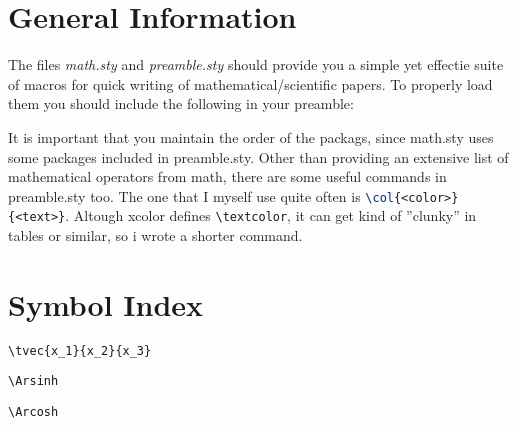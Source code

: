 \documentclass{report}
\begin{document}
  \section{General Information}
    The files \textit{math.sty} and \textit{preamble.sty} should provide you a simple yet effectie suite of
    macros for quick writing of mathematical/scientific papers. To properly load them you should include the
    following in your preamble:
    \begin{center}
        
    \end{center}

    It is important that you maintain the order of the packags, since math.sty uses some packages included in
    preamble.sty. Other than providing an extensive list of mathematical operators from math, there 
    are some useful commands in preamble.sty too.  The one that I myself use quite often is
    \lstinline[language=latex]|\col{<color>}{<text>}|. Altough xcolor defines \lstinline|\textcolor|,
    it can get kind of ''clunky'' in tables or similar, so i wrote a shorter command.


  \section{Symbol Index}

    \newsavebox\tveccol
    \begin{lrbox}{\tveccol}
      \begin{minipage}[t]{3cm}
        \lstinline|\tvec{x_1}{x_2}{x_3}|
      \end{minipage}
    \end{lrbox}

    \newsavebox\arsinhcol
    \begin{lrbox}{\arsinhcol}
      \begin{minipage}[t]{3cm}
        \lstinline|\Arsinh|
      \end{minipage}
    \end{lrbox}

    \newsavebox\arcoshcol
    \begin{lrbox}{\arcoshcol}
      \begin{minipage}[t]{3cm}
        \lstinline|\Arcosh|
      \end{minipage}
    \end{lrbox}
\end{document}
